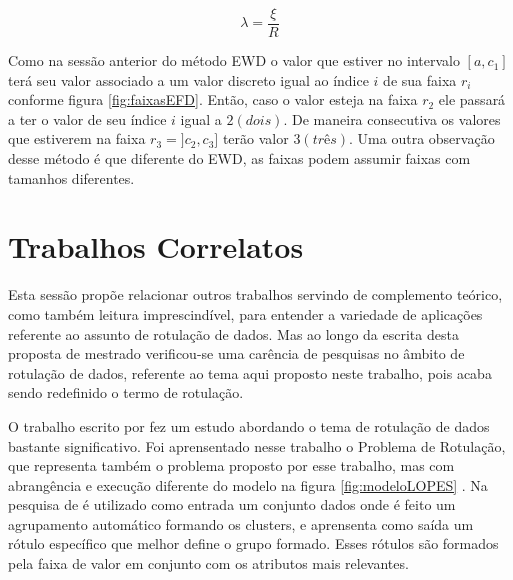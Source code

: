 \begin{equation}
\lambda = \frac{\xi}{R}
 \label{eq:pontocorteEFD}
\end{equation}

Como na sessão anterior do método EWD o valor que estiver no intervalo ${[a,c_1]}$ terá seu valor associado a um valor discreto igual ao índice ${i}$ de sua faixa ${r_i}$ conforme figura \ref{fig:faixasEFD}. Então, caso o valor esteja na faixa ${r_2}$ ele passará a ter o valor de seu índice ${i}$ igual a ${2(dois)}$. De maneira consecutiva os valores que estiverem na faixa ${r_3=]c_2,c_3]}$ terão valor ${3(três)}$. Uma outra observação desse método é que diferente do EWD, as faixas podem assumir faixas com tamanhos diferentes.

\section{Trabalhos Correlatos}\label{sec:trabcorrel}

Esta sessão propõe relacionar outros trabalhos servindo de complemento teórico, como também leitura imprescindível, para entender a variedade de aplicações referente ao assunto de rotulação de dados. Mas ao longo da escrita desta proposta de mestrado verificou-se uma carência de pesquisas no âmbito de rotulação de dados, referente ao tema aqui proposto neste trabalho, pois  acaba sendo redefinido o termo de rotulação.

O trabalho escrito por \cite{Lopes} fez um estudo abordando o tema de rotulação de dados bastante significativo. Foi aprensentado nesse trabalho o Problema de Rotulação, que representa também o problema proposto por esse trabalho, mas com abrangência e execução diferente do modelo \cite{Lopes}  na figura \ref{fig:modeloLOPES} . Na pesquisa de \cite{Lopes} é utilizado como entrada um conjunto  dados onde é feito um agrupamento automático formando os clusters, e aprensenta como saída um rótulo específico que melhor define o grupo formado. Esses rótulos são formados pela faixa de valor em conjunto com os atributos mais relevantes.

